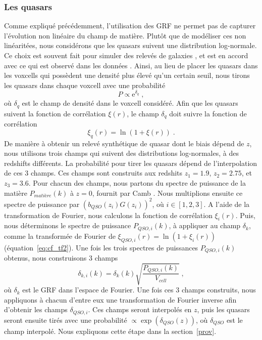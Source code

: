 \documentclass[11pt, twoside, a4paper, openright]{report}
\begin{document}
\subsubsection{Les quasars}
Comme expliqué précédemment, l'utilisation des GRF ne permet pas de capturer l'évolution non linéaire du champ de matière. Plutôt que de modéliser ces non linéaritées, nous considérons que les quasars suivent une distribution log-normale.
Ce choix est souvent fait pour simuler des relevés de galaxies \citep{agrawal_generating_2017}, et est en accord avec ce qui est observé dans les données \citep{Clerkin2016}.
Ainsi, au lieu de placer les quasars dans les voxcells qui possèdent une densité plus élevé qu'un certain seuil, nous tirons les quasars dans chaque voxcell avec une probabilité
\begin{equation}
  P \propto \mathrm{e}^{\delta_q} \; ,
\end{equation}
où $\delta_q$ est le champ de densité dans le voxcell considéré.
Afin que les quasars suivent la fonction de corrélation $\xi(r)$, le champ $\delta_q$ doit suivre la fonction de corrélation
\begin{equation}
  \label{eq:lognormal}
  \xi_q(r) = \ln(1+\xi(r)) \; .
\end{equation}
De manière à obtenir un relevé synthétique de quasar dont le biais dépend de $z$, nous utilisons trois champs qui suivent des distributions log-normales, à des redshifts différents. La probabilité pour tirer les quasars dépend de l'interpolation de ces 3 champs. Ces champs sont construits aux redshits $z_1 = \num{1.9}$, $z_2 = \num{2.75}$, et $z_3 = \num{3.6}$. Pour chacun des champs, nous partons du spectre de puissance de la matière $P_{matière}(k)$ à $z=0$, fournit par Camb \citep{Lewis1999}. Nous multiplions ensuite ce spectre de puissance par $(b_{QSO}(z_i) G(z_i))^2$, où $i \in [1, 2, 3]$. A l'aide de la transformation de Fourier, nous calculons la fonction de corrélation $\xi_{i}(r)$. Puis, nous déterminons le spectre de puissance $P_{QSO,i}(k)$, à appliquer au champ $\delta_k$, comme la transformée de Fourier de $\xi_{QSO,i}(r) = \ln(1+\xi_i(r))$ (équation~\ref{eq:cf_tf2}).
Une fois les trois spectres de puissances $P_{QSO,i}(k)$ obtenus, nous construisons 3 champs
\begin{equation}
  \delta_{k,i}(k)  = \delta_k(k) \sqrt{\frac{P_{QSO,i}(k)}{V_{cell}}} \; ,
\end{equation}
où $\delta_k$ est le GRF dans l'espace de Fourier. Une fois ces 3 champs construits, nous appliquons à chacun d'entre eux une transformation de Fourier inverse afin d'obtenir les champs $\delta_{QSO, i}$. Ces champs seront interpolés en $z$, puis les quasars seront ensuite tirés avec une probabilité $\propto \exp(\delta_{QSO}(z))$, où $\delta_{QSO}$ est le champ interpolé. Nous expliquons cette étape dans la section~\ref{prov}.
\end{document}
